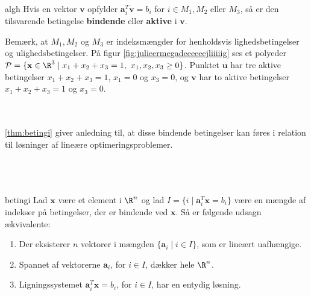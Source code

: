 %
\begin{defn}{}{algh}
Hvis en vektor $\textbf{v}$ opfylder $\textbf{a}^T_i\textbf{v}= b_i$ for $i \in M_1, M_2$ eller $M_3$, så er den tilsvarende betingelse \textbf{bindende} eller \textbf{aktive} i $\textbf{v}$.
\end{defn}\noindent
%
Bemærk, at $M_1, M_2$ og $M_3$ er indeksmængder for henholdsvis lighedsbetingelser og ulighedsbetingelser.
På figur \ref{fig:julieermegadeeeeeejliiiiig} ses et polyeder $\mathcal{P}= \{ \mathbf{x} \in \R^3 \mid x_1 + x_2 + x_3 = 1, \text{  } x_1 , x_2, x_3 \geq 0  \}$. 
Punktet $\textbf{u}$ har tre aktive betingelser $x_1 + x_2 + x_3 = 1$, $x_1=0$ og $x_3=0$, og $\mathbf{v}$ har to aktive betingelser $x_1 + x_2 + x_3 = 1$ og $x_3=0$.
%

\\\\
%
\ref{thm:betingi} giver anledning til, at disse bindende betingelser kan føres i relation til løsninger af lineære optimeringsproblemer.
\\\\
\phantom{Hej}
\\\\
%
%
\begin{thm}{}{betingi}
Lad $\textbf{x}$ være et element i $\R^n$ og lad $I=\{i \mid \textbf{a}^T_i\textbf{x}=b_i\}$ være en mængde af indekser på betingelser, der er bindende ved $\textbf{x}$.
Så er følgende udsagn ækvivalente:
%
\begin{enumerate}[label=(\alph*)]
\item Der eksisterer $n$ vektorer i mængden $\{\textbf{a}_i \mid i \in I \}$, som er lineært uafhængige.
\item Spannet af vektorerne $\textbf{a}_i$, for $i \in I$, dækker hele $\R^n$.
\item Ligningssystemet $\textbf{a}^T_i\textbf{x}= b_i$, for $i \in I$, har en entydig løsning.
\end{enumerate}
\end{thm}
%
